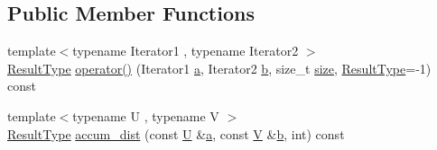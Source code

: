 \subsection*{Public Member Functions}
\begin{DoxyCompactItemize}
\item 
{\footnotesize template$<$typename Iterator1 , typename Iterator2 $>$ }\\\hyperlink{structcvflann_1_1HellingerDistance_a5ea5bc129fed2c06da92c75586ef5833}{Result\-Type} \hyperlink{structcvflann_1_1HellingerDistance_ac7fce120a086c9b9f1224ecc923bbbd5}{operator()} (Iterator1 \hyperlink{legacy_8hpp_a1031d0e0a97a340abfe0a6ab9e831045}{a}, Iterator2 \hyperlink{legacy_8hpp_ac04272e8ca865b8fba18d36edae9fd2a}{b}, size\-\_\-t \hyperlink{legacy_8hpp_ae97003f8d5c64cdfb99f6f2606d121b6}{size}, \hyperlink{structcvflann_1_1HellingerDistance_a5ea5bc129fed2c06da92c75586ef5833}{Result\-Type}=-\/1) const 
\item 
{\footnotesize template$<$typename U , typename V $>$ }\\\hyperlink{structcvflann_1_1HellingerDistance_a5ea5bc129fed2c06da92c75586ef5833}{Result\-Type} \hyperlink{structcvflann_1_1HellingerDistance_a4f161f3330cb311dc2790d566fe9de28}{accum\-\_\-dist} (const \hyperlink{core__c_8h_aa9c521f41af9a5191e5e4b6ffbae211a}{U} \&\hyperlink{legacy_8hpp_a1031d0e0a97a340abfe0a6ab9e831045}{a}, const \hyperlink{core__c_8h_ad8dd4fff0e3910932187b6de0543cae1}{V} \&\hyperlink{legacy_8hpp_ac04272e8ca865b8fba18d36edae9fd2a}{b}, int) const 
\end{DoxyCompactItemize}



